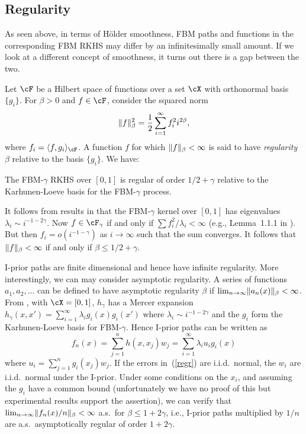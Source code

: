 \documentclass[preprint,12pt,authoryear]{elsarticle}
\DeclarePairedDelimiter{\norm}{\lVert}{\rVert}
\begin{document}
\subsection{Regularity}\label{sec-reg}

As seen above, in terms of H\"older smoothness, FBM paths and functions in the corresponding FBM RKHS may differ by an infinitesimally small amount. If we look at a different concept of smoothness, it turns out there is a gap between the two.

Let $\cF$ be a Hilbert space of functions over a set $\cX$ with orthonormal basis $\{g_i\}$.
For $\beta>0$ and $f\in\cF$, consider the squared norm
\begin{align}\label{sobloss}  \norm{f}_\beta^2 = \frac12\sum_{i=1}^\infty f_i^2i^{2\beta}, \end{align}
where $f_i=\langle f,g_i\rangle_{\cF}$.
A function $f$ for which $\norm{f}_\beta<\infty$ is said to have {\em regularity} $\beta$ relative to the basis $\{g_i\}$. 
We have:
\begin{lemma}\label{lem-reg}
	The FBM-$\gamma$ RKHS over $[0,1]$ is regular of order $1/2+\gamma$ relative to the Karhunen-Loeve basis for the FBM-$\gamma$ process. 
\end{lemma}
It follows from results in \citet{bronski03small} that the FBM-$\gamma$ kernel over $[0,1]$ has eigenvalues $\lambda_i\sim i^{-1-2\gamma}$. 
Now $f\in\cF_{\gamma}$ if and only if $\sum f_i^2/\lambda_i<\infty$ (e.g., Lemma~1.1.1 in \citet{wahba90}).
But then $f_i=o(i^{-1-\gamma})$ as $i\rightarrow\infty$ such that the sum converges.
It follows that $\norm{f}_\beta<\infty$ if and only if $\beta\le1/2+\gamma$.
\endproof


I-prior paths are finite dimensional and hence have infinite regularity. More interestingly, we can may consider asymptotic regularity.
A series of functions $a_1,a_2,\ldots$ can be defined to have asymptotic regularity $\beta$ if $\lim_{n\rightarrow\infty}\norm{a_n(x)}_\beta<\infty$.
From \citet{bronski03small}, with $\cX=[0,1]$, $h_\gamma$ has a Mercer expansion
$h_\gamma(x,x') = \sum_{i=1}^\infty \lambda_i g_i(x)g_i(x')$ 
where $\lambda_i\sim i^{-1-2\gamma}$ and the $g_i$ form the Karhunen-Loeve basis for FBM-$\gamma$. Hence I-prior paths can be written as
\[  f_n(x) = \sum_{j=1}^nh(x,x_j)w_j = \sum_{i=1}^\infty\lambda_iu_ig_i(x) \]
where $u_i=\sum_{j=1}^ng_i(x_j)w_j$. If the errors in~(\ref{regr}) are i.i.d.\  normal, the $w_i$ are i.i.d.\  normal under the I-prior.
Under some conditions on the $x_i$, and assuming the $g_i$ have a common bound (unfortunately we have no proof of this but experimental results support the assertion), we can verify that $\lim_{n\rightarrow\infty}\norm{f_n(x)/n}_\beta<\infty$ a.s.\ for $\beta\le 1+2\gamma$, i.e., I-prior paths multiplied by $1/n$ are a.s.\ asymptotically regular of order $1+2\gamma$. 
\end{document}
